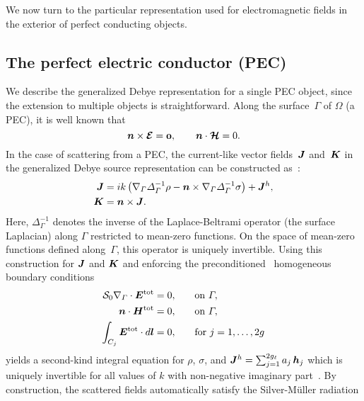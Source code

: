 \documentclass[11pt]{article}
\newcommand{\vct}{\vectorsym}
\newcommand{\surfdiv}{\nabla_\Gamma \cdot}
\newcommand{\surfgrad}{\nabla_\Gamma}
\newcommand{\surflap}{\Delta_\Gamma}
\newcommand{\bcE}{\bm{{\mathcal E}}}
\newcommand{\bcH}{\bm{\mathcal H}}
\newcommand{\bJ}{\vct{ J}}
\newcommand{\bK}{\vct{ K}}
\newcommand{\cM}{\mathcal M}
\newcommand{\cS}{\mathcal S}
\newcommand\bzero{\vct{ 0}}
\newcommand\nhat{\vct{ {n}}}
\newcommand\bl{\vct{ l}}
\newcommand\bh{\vct{h}}
\newcommand\bEtot{\vct{E}^\textnormal{tot}}
\newcommand\bHtot{\vct{H}^\textnormal{tot}}
\numberwithin{equation}{section}
\begin{document}
We now turn to the particular representation used for electromagnetic
fields in the exterior of perfect conducting objects. 


\subsection{The perfect electric conductor (PEC)}
\label{sec_pec}

We describe the generalized Debye representation for a single PEC
object, since the extension to multiple 
objects is straightforward.  Along the surface~$\Gamma$
of $\Omega$ (a PEC), it is well known that 
\begin{equation}\label{eq_pecbcs}
    \nhat \times \bcE = \bzero, \qquad \nhat \cdot \bcH = 0.
\end{equation}
In the case of scattering from a PEC, the current-like vector
fields~$\bJ$ and~$\bK$
in the generalized Debye source representation can be constructed
as~\cite{EpGr}:
\begin{equation}
  \label{eq_jbuild}
  \begin{aligned}
    \bJ &= ik \left( \surfgrad \surflap^{-1} \rho - \nhat \times 
      \surfgrad \surflap^{-1} \sigma \right) + \bJ^h, \\
    \bK &= \nhat \times \bJ.
  \end{aligned}
\end{equation}
Here, 
$\surflap^{-1}$ denotes the inverse of the Laplace-Beltrami
operator (the surface Laplacian) along $\Gamma$ restricted to mean-zero functions. 
On the space of mean-zero functions defined along~$\Gamma$, %
this operator is uniquely invertible. Using
this construction for $\bJ$ and $\bK$ and enforcing the
preconditioned~\cite{nedelec} homogeneous boundary conditions
\begin{equation}\label{eq_pecinteq1}
  \begin{aligned}
    \cS_0 \surfdiv \bEtot &= 0, &\quad &\text{on } \Gamma, \\
     \nhat \cdot \bHtot &= 0,  & &\text{on } \Gamma, \\
     \int_{C_j} \bEtot \cdot d\bl &= 0, & &\text{for } j = 1,\ldots,
     2g
  \end{aligned}
\end{equation}
yields a second-kind integral equation for $\rho$, $\sigma$, and
$\bJ^h = \sum_{j = 1}^{2g_\ell} a_{j} \, \bh_{j}$
which is uniquely invertible for all values of $k$ with
non-negative imaginary part~\cite{EpGr}. By construction, the
scattered fields automatically satisfy the Silver-M\"uller radiation
\end{document}
